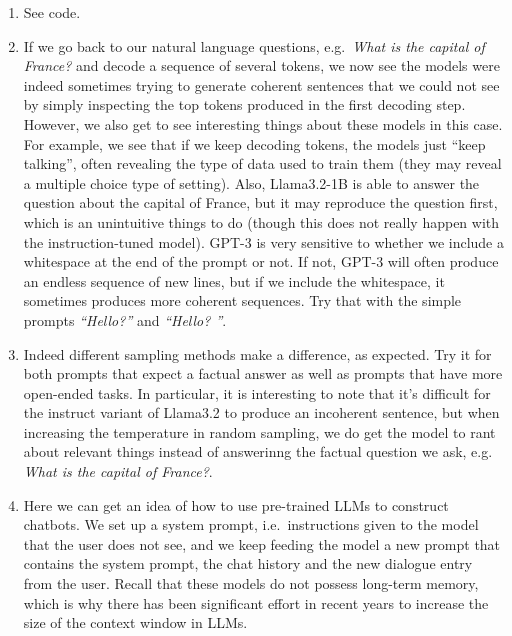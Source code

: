 \documentclass[11pt,a4paper]{article}
\begin{document}
\begin{enumerate}[label=(\alph*)]
    \item See code.
    \item If we go back to our natural language questions, e.g.\
          \emph{What is the capital of France?} and decode a sequence of several
          tokens, we now see the models were indeed sometimes trying to generate
          coherent sentences that we could not see by simply inspecting the top
          tokens produced in the first decoding step.
          However, we also get to see interesting things about these models in
          this case.
          For example, we see that if we keep decoding tokens, the models just
          ``keep talking'', often revealing the type of data used to train them
          (they may reveal a multiple choice type of setting).
          Also, Llama3.2-1B is able to answer the question about the capital of
          France, but it may reproduce the question first, which is an
          unintuitive things to do (though this does not really happen with
          the instruction-tuned model).
          GPT-3 is very sensitive to whether we include a whitespace at the end
          of the prompt or not.
          If not, GPT-3 will often produce an endless sequence of new lines, but
          if we include the whitespace, it sometimes produces more coherent
          sequences. Try that with the simple prompts \emph{``Hello?''} and
          \emph{``Hello? ''}.
    \item Indeed different sampling methods make a difference, as expected.
          Try it for both prompts that expect a factual answer as well as
          prompts that have more open-ended tasks.
          In particular, it is interesting to note that it's difficult for the
          instruct variant of Llama3.2 to produce an incoherent sentence, but
          when increasing the temperature in random sampling, we do get the
          model to rant about relevant things instead of answerinng the
          factual question we ask, e.g. \emph{What is the capital of France?}.
    \item Here we can get an idea of how to use pre-trained LLMs to construct
          chatbots. We set up a system prompt, i.e.\ instructions given to the 
          model that the user does not see, and we keep feeding the model a 
          new prompt that contains the system prompt, the chat history and the 
          new dialogue entry from the user. 
          Recall that these models do not possess long-term memory, which is why
          there has been significant effort in recent years to increase the size
          of the context window in LLMs.
          

\end{enumerate}
\end{document}

